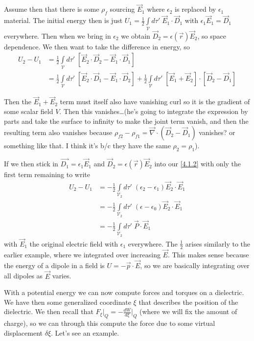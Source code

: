 \documentclass[10pt]{report}
\newcommand{\rd}[2]{\frac{d#1}{d#2}}
\begin{document}
Assume then that there is some $\rho_f$ sourcing $\vec{E}_1$ where $\epsilon_2$ is replaced by $\epsilon_1$ material. The initial energy then is just $U_1 = \frac{1}{2}\int\limits_{\mathcal{V}}^{}d\tau'\;\vec{E}_1 \cdot \vec{D}_1$ with $\epsilon_1\vec{E}_1 = \vec{D}_1$ everywhere. Then when we bring in $\epsilon_2$ we obtain $\vec{D}_2 = \epsilon(\vec{r})\vec{E}_2$, so space dependence. We then want to take the difference in energy, so
\begin{align}
    U_2 - U_1 &= \frac{1}{2}\int\limits_{\mathcal{V}}^{}d\tau'\;\left[ \vec{E}_2\cdot \vec{D}_2 - \vec{E}_1 \cdot \vec{D}_1 \right]\\
    &= \frac{1}{2}\int\limits_{\mathcal{V}}^{}d\tau'\;\left[ \vec{E}_2 \cdot \vec{D}_1 - \vec{E}_1\cdot \vec{D}_2 \right] + \frac{1}{2}\int\limits_{\mathcal{V}}^{}d\tau'\;\left[ \vec{E}_1 + \vec{E}_2 \right]\cdot\left[ \vec{D}_2 - \vec{D}_1 \right]\label{4.1.2}
\end{align}

Then the $\vec{E}_1 + \vec{E}_2$ term must itself also have vanishing curl so it is the gradient of some scalar field $V$. Then this vanishes\dots (he's going to integrate the expression by parts and take the surface to infinity to make the joint term vanish, and then the resulting term also vanishes because $\rho_{f2} - \rho_{f1} = \vec{\nabla}\cdot (\vec{D}_2 - \vec{D}_1)$ vanishes? or something like that. I think it's b/c they have the same $\rho_2 = \rho_1$).

If we then stick in $\vec{D_1} = \epsilon_1\vec{E}_1$ and $\vec{D}_2 = \epsilon(\vec{r})\vec{E}_2$ into our \eqref{4.1.2} with only the first term remaining to write
\begin{align}
    U_2 - U_1 &= -\frac{1}{2}\int\limits_{\mathcal{V}_2}^{}d\tau'\;\left( \epsilon_2 - \epsilon_1 \right)\vec{E}_2\cdot \vec{E}_1\\
    &= -\frac{1}{2}\int\limits_{\mathcal{V}_2}^{}d\tau'\;(\epsilon - \epsilon_0)\vec{E}_2 \cdot \vec{E}_1\\
    &= -\frac{1}{2}\int\limits_{\mathcal{V}_2}^{}d\tau'\;\vec{P}\cdot \vec{E}_1
\end{align}
with $\vec{E}_1$ the original electric field with $\epsilon_1$ everywhere. The $\frac{1}{2}$ arises similarly to the earlier example, where we integrated over increasing $\vec{E}$. This makes sense because the energy of a dipole in a field is $U = -\vec{p}\cdot \vec{E}$, so we are basically integrating over all dipoles as $\vec{E}$ varies.

With a potential energy we can now compute forces and torques on a dielectric. We have then some generalized coordinate $\xi$ that describes the position of the dielectric. We then recall that $F_\xi\Big|_Q = -\rd{W}{\xi}\Big|_Q$ (where we will fix the amount of charge), so we can through this compute the force due to some virtual displacement $\delta\xi$. Let's see an example.
\end{document}
